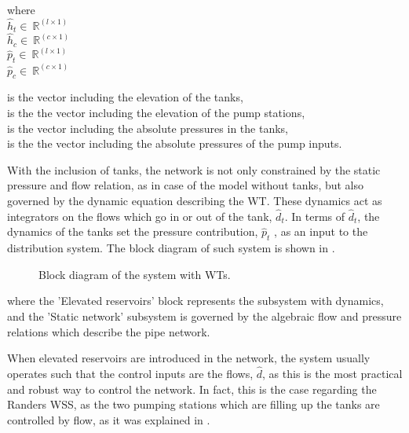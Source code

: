  \begin{minipage}[t]{0.20\textwidth}
where\\
\hspace*{8mm} $\hat{h}_t \in \: \mathbb{R}^{(l \times 1)}$\\
\hspace*{8mm} $\hat{h}_c \in \: \mathbb{R}^{(c  \times  1)}$ \\
\newline
\hspace*{8mm} $\hat{p}_t \in \: \mathbb{R}^{(l \times 1)}$\\
\hspace*{8mm} $\hat{p}_c \in \: \mathbb{R}^{(c \times 1)}$ 
\end{minipage}
\begin{minipage}[t]{0.68\textwidth}
\vspace*{2mm}
is the vector including the elevation of the tanks,\\
is the the vector including the elevation of the pump stations,\\
is the vector including the absolute pressures in the tanks,\\
is the the vector including the absolute pressures of the pump inputs.
\end{minipage}

With the inclusion of tanks, the network is not only constrained by the static pressure and flow relation, as in case of the model without tanks, but also governed by the dynamic equation describing the WT. These dynamics act as integrators on the flows which go in or out of the tank, $\hat{d}_t$. In terms of $\hat{d}_t$, the dynamics of the tanks set the pressure contribution, $\hat{p}_t$ , as an input to the distribution system. The block diagram of such system is shown in .

\begin{figure}[H]
\centering
 
\caption{Block diagram of the system with WTs.}
\label{fig:WT_system_blockdiagram}
\end{figure}

where the 'Elevated reservoirs' block represents the subsystem with dynamics, and the 'Static network' subsystem is governed by the algebraic flow and pressure relations which describe the pipe network. 

When elevated reservoirs are introduced in the network, the system usually operates such that the control inputs are the flows, $\hat{d}$, as this is the most practical and robust way to control the network. In fact, this is the case regarding the Randers WSS, as the two pumping stations which are filling up the tanks are controlled by flow, as it was explained in . 

